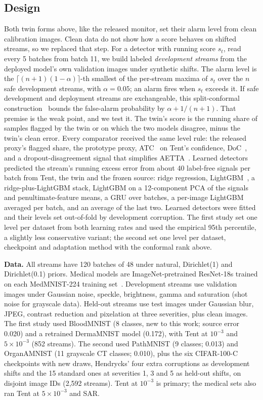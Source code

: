 \documentclass[runningheads]{llncs}
\begin{document}
\subsection{Design}
Both twin forms above, like the released monitor, set their alarm level from clean calibration images. Clean data do not show how a score behaves on shifted streams, so we replaced that step. For a detector with running score $s_t$, read every 5 batches from batch 11, we build labeled \emph{development streams} from the deployed model's own validation images under synthetic shifts. The alarm level is the $\lceil (n+1)(1-\alpha)\rceil$-th smallest of the per-stream maxima of $s_t$ over the $n$ safe development streams, with $\alpha=0.05$; an alarm fires when $s_t$ exceeds it. If safe development and deployment streams are exchangeable, this split-conformal construction~\cite{Vovk2005ALRW} bounds the false-alarm probability by $\alpha+1/(n+1)$. That premise is the weak point, and we test it. The twin's score is the running share of samples flagged by the twin or on which the two models disagree, minus the twin's clean error. Every comparator received the same level rule: the released proxy's flagged share, the prototype proxy, ATC~\cite{Garg2022ATC} on Tent's confidence, DoC~\cite{Guillory2021DoC}, and a dropout-disagreement signal that simplifies AETTA~\cite{Lee2024AETTA}. Learned detectors predicted the stream's running excess error from about 40 label-free signals per batch from Tent, the twin and the frozen source: ridge regression, LightGBM~\cite{Ke2017LightGBM}, a ridge-plus-LightGBM stack, LightGBM on a 12-component PCA of the signals and penultimate-feature means, a GRU over batches, a per-image LightGBM averaged per batch, and an average of the last two. Learned detectors were fitted and their levels set out-of-fold by development corruption. The first study set one level per dataset from both learning rates and used the empirical 95th percentile, a slightly less conservative variant; the second set one level per dataset, checkpoint and adaptation method with the conformal rank above.

\textbf{Data.} All streams have 120 batches of 48 under natural, Dirichlet(1) and Dirichlet(0.1) priors. Medical models are ImageNet-pretrained ResNet-18s trained on each MedMNIST-224 training set~\cite{Yang2023MedMNIST}. Development streams use validation images under Gaussian noise, speckle, brightness, gamma and saturation (shot noise for grayscale data). Held-out streams use test images under Gaussian blur, JPEG, contrast reduction and pixelation at three severities, plus clean images. The first study used BloodMNIST (8 classes, new to this work; source error 0.020) and a retrained DermaMNIST model (0.172), with Tent at $10^{-3}$ and $5\times10^{-3}$ (852 streams). The second used PathMNIST (9 classes; 0.013) and OrganAMNIST (11 grayscale CT classes; 0.010), plus the six CIFAR-100-C checkpoints with new draws, Hendrycks' four extra corruptions as development shifts and the 15 standard ones at severities 1, 3 and 5 as held-out shifts, on disjoint image IDs (2,592 streams). Tent at $10^{-3}$ is primary; the medical sets also ran Tent at $5\times10^{-3}$ and SAR.
\end{document}
